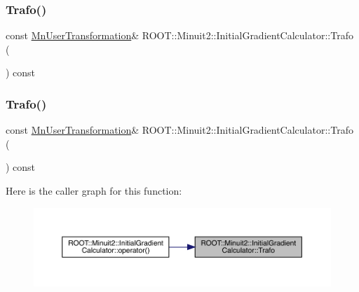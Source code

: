 \mbox{\label{classROOT_1_1Minuit2_1_1InitialGradientCalculator_aba7febb81b50fd961a9f7f754413a5c9}} 
\subsubsection{\texorpdfstring{Trafo()}{Trafo()}\hspace{0.1cm}{\footnotesize\ttfamily [2/3]}}
{\footnotesize\ttfamily const \mbox{\hyperlink{classROOT_1_1Minuit2_1_1MnUserTransformation}{Mn\+User\+Transformation}}\& R\+O\+O\+T\+::\+Minuit2\+::\+Initial\+Gradient\+Calculator\+::\+Trafo (\begin{DoxyParamCaption}{ }\end{DoxyParamCaption}) const\hspace{0.3cm}{\ttfamily [inline]}}

\mbox{\label{classROOT_1_1Minuit2_1_1InitialGradientCalculator_aba7febb81b50fd961a9f7f754413a5c9}} 
\subsubsection{\texorpdfstring{Trafo()}{Trafo()}\hspace{0.1cm}{\footnotesize\ttfamily [3/3]}}
{\footnotesize\ttfamily const \mbox{\hyperlink{classROOT_1_1Minuit2_1_1MnUserTransformation}{Mn\+User\+Transformation}}\& R\+O\+O\+T\+::\+Minuit2\+::\+Initial\+Gradient\+Calculator\+::\+Trafo (\begin{DoxyParamCaption}{ }\end{DoxyParamCaption}) const\hspace{0.3cm}{\ttfamily [inline]}}

Here is the caller graph for this function\+:
\nopagebreak
\begin{figure}[H]
\begin{center}
\leavevmode
\includegraphics[width=350pt]{d3/dcf/classROOT_1_1Minuit2_1_1InitialGradientCalculator_aba7febb81b50fd961a9f7f754413a5c9_icgraph}
\end{center}
\end{figure}



